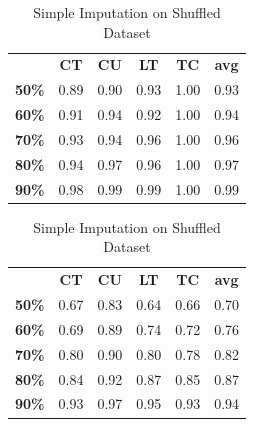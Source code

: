 \documentclass{article}
\begin{document}
\begin{table}[h]
\begin{minipage}{.45\textwidth}\centering
\begin{tabular}{cccccc}
			  & \textbf{CT} & \textbf{CU} & \textbf{LT} & \textbf{TC} & \textbf{avg} \\
\textbf{50\%} & 0.89        & 0.90        & 0.93        & 1.00        & 0.93 \\
\textbf{60\%} & 0.91        & 0.94        & 0.92        & 1.00        & 0.94 \\
\textbf{70\%} & 0.93        & 0.94        & 0.96        & 1.00        & 0.96 \\
\textbf{80\%} & 0.94        & 0.97        & 0.96        & 1.00        & 0.97 \\
\textbf{90\%} & 0.98        & 0.99        & 0.99        & 1.00        & 0.99
\end{tabular}
\caption{Simple Imputation}
\end{minipage}
\hfill
\begin{minipage}{.5\textwidth}\centering
\begin{tabular}{cccccc}
			  & \textbf{CT} & \textbf{CU} & \textbf{LT} & \textbf{TC} & \textbf{avg} \\
\textbf{50\%} & 0.67        & 0.83        & 0.64        & 0.66        & 0.70 \\
\textbf{60\%} & 0.69        & 0.89        & 0.74        & 0.72        & 0.76 \\
\textbf{70\%} & 0.80        & 0.90        & 0.80        & 0.78        & 0.82 \\
\textbf{80\%} & 0.84        & 0.92        & 0.87        & 0.85        & 0.87 \\
\textbf{90\%} & 0.93        & 0.97       & 0.95         & 0.93        & 0.94
\end{tabular}
\caption{Simple Imputation on Shuffled Dataset}
\end{minipage}
\end{table}
\end{document}
